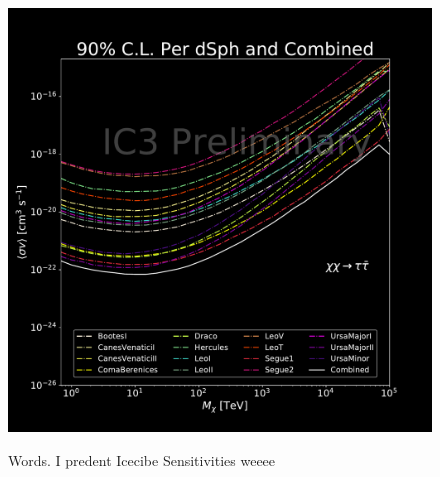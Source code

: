 \begin{figure}[t]
{        \includegraphics[scale=0.275]{figures/ic_DM/dm_plots/tautau_money_plot_comb.pdf}
    }
    \caption{Words. I predent Icecibe Sensitivities weeee}
    \label{fig:icDM_sensitivity_2of2}
\end{figure}